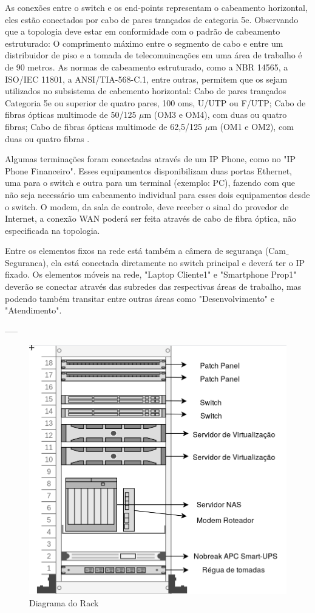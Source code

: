 \documentclass[	DIV=calc,%
							paper=a4,%
							fontsize=12pt,%
							onecolumn]{scrartcl}	 					%
\begin{document}
As conexões entre o switch e os end-points representam o cabeamento horizontal, eles estão conectados por cabo de pares trançados de categoria 5e. Observando que a topologia deve estar em conformidade com o padrão de cabeamento estruturado: 
O comprimento máximo entre o segmento de cabo e entre um distribuidor de piso e a tomada de telecomuincações em uma área de trabalho é de 90 metros. As normas de cabeamento estruturado, como a NBR 14565, a ISO/IEC 11801, a ANSI/TIA-568-C.1, entre outras, permitem que os sejam utilizados no subsistema de cabemento horizontal: Cabo de pares trançados Categoria 5e ou superior de quatro pares, 100 oms, U/UTP ou F/UTP; Cabo de fibras ópticas multimode de 50/125 $\mu$m (OM3 e OM4), com duas ou quatro fibras; Cabo de fibras ópticas multimode de 62,5/125 $\mu$m (OM1 e OM2), com duas ou quatro fibras \cite{marin2014cabeamento}.

Algumas terminações foram conectadas através de um IP Phone, como no "IP Phone Financeiro". Esses equipamentos disponibilizam duas portas Ethernet, uma para o switch e outra para um terminal (exemplo: PC), fazendo com que não seja necessário um cabeamento individual para esses dois equipamentos desde o switch. O modem, da sala de controle, deve receber o sinal do provedor de Internet, a conexão WAN poderá ser feita através de cabo de fibra óptica, não especificada na topologia.

Entre os elementos fixos na rede está também a câmera de segurança (Cam$\_$Seguranca), ela está conectada diretamente no switch principal e deverá ter o IP fixado. Os elementos móveis na rede, "Laptop Cliente1" e "Smartphone Prop1" deverão se conectar através das subredes das respectivas áreas de trabalho, mas podendo também transitar entre outras áreas como "Desenvolvimento" e "Atendimento".

-----

\begin{figure}[H]
	\centering
	\includegraphics[width=\textwidth]{rack}
	\caption{Diagrama do Rack}
	\label{diagrama-do-rack}
\end{figure}
\end{document}
